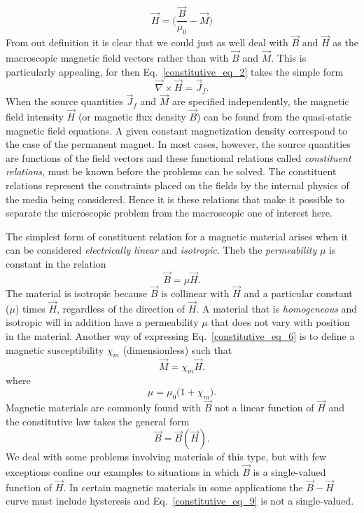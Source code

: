 \documentclass[11pt,a4paper,oneside]{book}
\numberwithin{equation}{section}
\theoremstyle{it}
\theoremstyle{definition}
\begin{document}
\begin{equation}\label{constitutive_eq_4}
	\vec{H}=\Big(\frac{\vec{B}}{\mu_0}-\vec{M}\Big)
\end{equation}
From out definition it is clear that we could just as well deal with $\vec{B}$ and $\vec{H}$ as the macroscopic magnetic field vectors rather than with $\vec{B}$ and $\vec{M}$. This is particularly appealing, for then Eq.~\eqref{constitutive_eq_2} takes the simple form
\begin{equation}\label{constitutive_eq_5}
	\vec{\nabla}\times\vec{H}=\vec{J}_f.
\end{equation}
When the source quantities $\vec{J}_f$ and $\vec{M}$ are specified independently, the magnetic field intensity $\vec{H}$ (or magnetic flux density $\vec{B}$) can be found from the quasi-static magnetic field equations. A given constant magnetization density correspond to the case of the permanent magnet. In most cases, however, the source quantities are functions of the field vectors and these functional relations called \textit{constituent relations}, must be known before the problems can be solved. The constituent relations represent the constraints placed on the fields by the internal physics of the media being considered.  Hence it is these relations that make it possible to separate the microscopic problem from the macroscopic one of interest here. 

The simplest form of constituent relation for a magnetic material arises when it can be considered \textit{electrically linear} and \textit{isotropic}. Theb the \textit{permeability} $\mu$ is constant in the relation
\begin{equation}\label{constitutive_eq_6}
	\vec{B}=\mu \vec{H}.
\end{equation}
The material is isotropic because $\vec{B}$ is collinear with $\vec{H}$ and a particular constant ($\mu$) times $\vec{H}$, regardless of the direction of $\vec{H}$. A material that is \textit{homogeneous} and isotropic will in addition have a permeability $\mu$ that does not vary with position in the material. Another way of expressing Eq.~\eqref{constitutive_eq_6} is to define a magnetic susceptibility $\chi_m$ (dimensionless) such that
\begin{equation}\label{constitutive_eq_7}
	\vec{M}=\chi_m\vec{H}.
\end{equation}
where 
\begin{equation}\label{constitutive_eq_8}
	\mu = \mu_0\Big(1+\chi_m\Big).
\end{equation}
Magnetic materials are commonly found with $\vec{B}$ not a linear function of $\vec{H}$ and the constitutive law takes the general form
\begin{equation}\label{constitutive_eq_9}
	\vec{B}=\vec{B}(\vec{H}).
\end{equation}
We deal with some problems involving materials of this type, but with few exceptions confine our examples to situations in which $\vec{B}$ is a single-valued function of $\vec{H}$. In certain magnetic materials in some applications the $\vec{B}-\vec{H}$ curve must include hysteresis and Eq.~\eqref{constitutive_eq_9} is not a single-valued.
\end{document}
